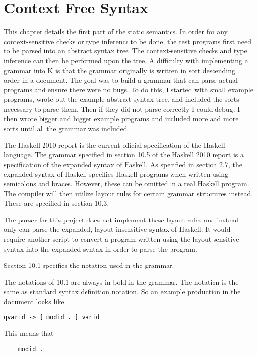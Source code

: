 \chapter{Context Free Syntax}
This chapter details the first part of the static semantics. In order for any context-sensitive checks or type inference to be done, the test programs first need to be parsed into an abstract syntax tree. The context-sensitive checks and type inference can then be performed upon the tree.
A difficulty with implementing a grammar into K is that the grammar originally is written in sort descending order in a document. The goal was to build a grammar that can parse actual programs and ensure there were no bugs. To do this, I started with small example programs, wrote out the example abstract syntax tree, and included the sorts necessary to parse them. Then if they did not parse correctly I could debug. I then wrote bigger and bigger example programs and included more and more sorts until all the grammar was included.

The Haskell 2010 report \cite{Report:Report} is the current official specification of the Haskell language. The grammar specified in section 10.5 of the Haskell 2010 report is a specification of the expanded syntax of Haskell. As specified in section 2.7, the expanded syntax of Haskell specifies Haskell programs when written using semicolons and braces. However, these can be omitted in a real Haskell program. The compiler will then utilize layout rules for certain grammar structures instead. These are specified in section 10.3.

The parser for this project does not implement these layout rules and instead only can parse the expanded, layout-insensitive syntax of Haskell. It would require another script to convert a program written using the layout-sensitive syntax into the expanded syntax in order to parse the program.

Section 10.1 \cite{Report:Report} specifies the notation used in the grammar.

The notations of 10.1 are always in bold in the grammar. The notation is the same as standard syntax definition notation.
So an example production in the document looks like

\texttt{qvarid -> \textbf{[} modid . \textbf{]} varid}

\noindent
This means that 

\begin{lstlisting}
	modid .
\end{lstlisting}

